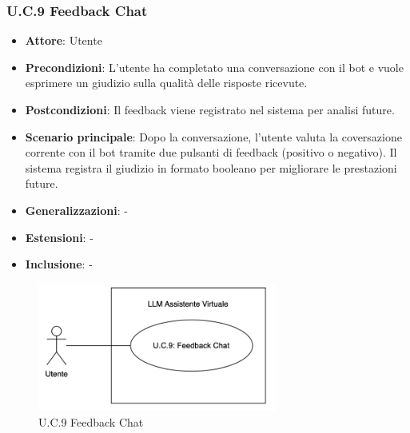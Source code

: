 \subsubsection{U.C.9 Feedback Chat}
\begin{itemize}
    \item \textbf{Attore}: Utente
    \item \textbf{Precondizioni}: L'utente ha completato una conversazione con il bot e vuole esprimere un giudizio sulla qualità delle risposte ricevute.
    \item \textbf{Postcondizioni}: Il feedback viene registrato nel sistema per analisi future.
    \item \textbf{Scenario principale}: Dopo la conversazione, l'utente valuta la coversazione corrente con il bot tramite due pulsanti di feedback (positivo o negativo). Il sistema registra il giudizio in formato booleano per migliorare le prestazioni future.
    \item \textbf{Generalizzazioni}: -
    \item \textbf{Estensioni}: -
    \item \textbf{Inclusione}: -
\end{itemize}
\begin{figure}[H]
    \centering
    \includegraphics[width=0.7\textwidth]{img/UC9.png}
    \caption{U.C.9 Feedback Chat}
\end{figure}
\newpage

